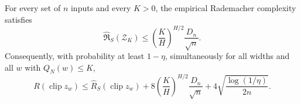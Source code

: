 \begin{lemma}
\label{lem:gaussian-capacity}
For every set of $n$ inputs and every $K>0$, the empirical Rademacher
complexity satisfies
\begin{equation}
 \widehat{\mathfrak R}_S(\mathcal Z_K)
 \leq \left(\frac KH\right)^{H/2}\frac{D_n}{\sqrt n}.
 \label{eq:gaussian-rademacher}
\end{equation}
Consequently, with probability at least $1-\eta$, simultaneously for all
widths and all $w$ with $Q_N(w)\leq K$,
\begin{equation}
 R(\operatorname{clip}z_w)
 \leq\widehat R_S(\operatorname{clip}z_w)
 +8\left(\frac KH\right)^{H/2}\frac{D_n}{\sqrt n}
 +4\sqrt{\frac{\log(1/\eta)}{2n}}.
 \label{eq:gaussian-fixed-energy-deviation}
\end{equation}
\end{lemma}
